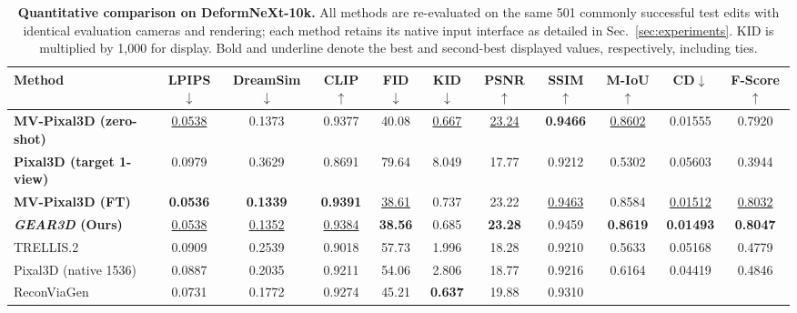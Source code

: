 \begin{table}[t!]
\centering
\caption{\small
\textbf{Quantitative comparison on DeformNeXt-10k.}
All methods are re-evaluated on the same 501 commonly successful test edits
with identical evaluation cameras and rendering; each method retains its
native input interface as detailed in Sec.~\ref{sec:experiments}.
KID is multiplied by 1,000 for display. Bold and underline denote the best and
second-best displayed values, respectively, including ties.
}
\label{tab:main_quantitative}

\begingroup
\footnotesize
\setlength{\tabcolsep}{2.0pt}
\setlength{\fboxsep}{0.7pt}
\renewcommand{\arraystretch}{1.12}
\begin{tabular*}{\textwidth}{@{\extracolsep{\fill}}l|*{10}{c}@{}}
\toprule[0.25mm]
\textbf{Method} & \textbf{LPIPS}$\downarrow$ & \textbf{DreamSim}$\downarrow$
& \textbf{CLIP}$\uparrow$ & \textbf{FID}$\downarrow$ & \textbf{KID}$\downarrow$
& \textbf{PSNR}$\uparrow$ & \textbf{SSIM}$\uparrow$ & \textbf{M-IoU}$\uparrow$
& \textbf{CD}$\downarrow$ & \textbf{F-Score}$\uparrow$ \\
\midrule
\textbf{MV-Pixal3D (zero-shot)}
& \underline{0.0538} & 0.1373 & 0.9377 & 40.08 & \underline{0.667}
& \underline{23.24} & \textbf{0.9466} & \underline{0.8602} & 0.01555 & 0.7920 \\
\textbf{Pixal3D (target 1-view)}~\cite{li2026pixal3d}
& 0.0979 & 0.3629 & 0.8691 & 79.64 & 8.049
& 17.77 & 0.9212 & 0.5302 & 0.05603 & 0.3944 \\
\textbf{MV-Pixal3D (FT)}
& \textbf{0.0536} & \textbf{0.1339} & \textbf{0.9391}
& \underline{38.61} & 0.737 & 23.22
& \underline{0.9463} & 0.8584 & \underline{0.01512}
& \underline{0.8032} \\
\textbf{\emph{GEAR3D} (Ours)}
& \underline{0.0538} & \underline{0.1352} & \underline{0.9384}
& \textbf{38.56} & 0.685 & \textbf{23.28}
& 0.9459 & \textbf{0.8619} & \textbf{0.01493}
& \textbf{0.8047} \\
\midrule
TRELLIS.2~\cite{Xiang_2026_CVPR_Trellis2}
& 0.0909 & 0.2539 & 0.9018 & 57.73
& 1.996 & 18.28 & 0.9210
& 0.5633 & 0.05168 & 0.4779 \\
Pixal3D (native 1536)~\cite{li2026pixal3d}
& 0.0887 & 0.2035 & 0.9211 & 54.06
& 2.806 & 18.77 & 0.9216 & 0.6164 & 0.04419 & 0.4846 \\
ReconViaGen~\cite{chang2026reconviagen}
& 0.0731 & 0.1772 & 0.9274 & 45.21
& \textbf{0.637} & 19.88 & 0.9310

\end{tabular*}
\end{table}
